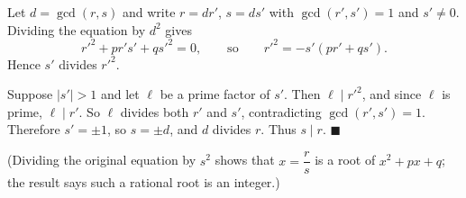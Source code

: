 Let $d=\gcd(r,s)$ and write $r=dr'$, $s=ds'$ with $\gcd(r',s')=1$ and $s'\neq0$. Dividing the equation by $d^2$ gives
\[
r'^2+pr's'+qs'^2=0,\qquad\text{so}\qquad r'^2=-s'(pr'+qs').
\]
Hence $s'$ divides $r'^2$.

Suppose $|s'|>1$ and let $\ell$ be a prime factor of $s'$. Then $\ell\mid r'^2$, and since $\ell$ is prime, $\ell\mid r'$. So $\ell$ divides both $r'$ and $s'$, contradicting $\gcd(r',s')=1$. Therefore $s'=\pm1$, so $s=\pm d$, and $d$ divides $r$. Thus $s\mid r$. $\blacksquare$

(Dividing the original equation by $s^2$ shows that $x=\dfrac{r}{s}$ is a root of $x^2+px+q$; the result says such a rational root is an integer.)
